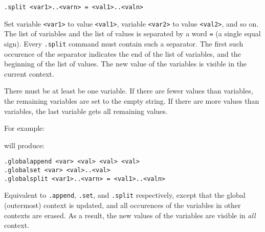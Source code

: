 \begin{verbatim}
.split <var1>..<varn> = <val1>..<valn>
\end{verbatim}
\begin{desc}
Set variable \texttt{<var1>} to value \texttt{<val1>}, variable
\texttt{<var2>} to value \texttt{<val2>}, and so on. The list of
variables and the list of values is separated by a word \texttt{=}
(a single equal sign). Every \texttt{.split} command must contain such
a separator. The first such occurence of the separator indicates
the end of the list of variables, and the beginning of the list of
values. The new value of the variables is visible in the current context.

There must be at least be one variable. If there are fewer values
than variables, the remaining variables are set to the empty string. If
there are more values than variables, the last variable gets all
remaining values.

For example:
\begin{showfile}

\end{showfile}
will produce:
\begin{showfile}

\end{showfile}
\end{desc}

\begin{verbatim}
.globalappend <var> <val> <val> <val>
.globalset <var> <val>..<val>
.globalsplit <var1>..<varn> = <val1>..<valn>
\end{verbatim}
\begin{desc}
Equivalent to \texttt{.append}, \texttt{.set}, and \texttt{.split}
respectively, except that the global (outermost) context is updated,
and all occurences of the variables in other contexts are erased.
As a result, the new values of the variables are visible in \emph{all}
context.
\end{desc}

